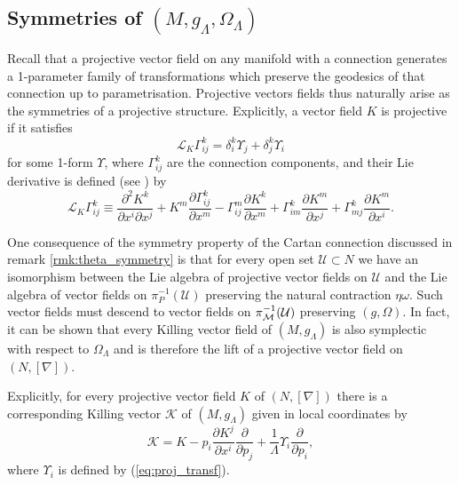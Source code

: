  \subsection{Symmetries of $(M,g_{\Lambda},\Omega_{\Lambda})$}

Recall that a projective vector field on any manifold with a connection
generates a 1-parameter family of transformations which preserve the
geodesics of that connection up to parametrisation. Projective vectors
fields thus naturally arise as the symmetries of a projective structure.
Explicitly, a vector field $K$ is projective if it satisfies
\begin{equation}
\mathcal{L}_{K}\Gamma_{ij}^{k}=\delta_{i}^{k}\Upsilon_{j}+\delta_{j}^{k}\Upsilon_{i}\label{eq:proj_transf}
\end{equation}
for some 1-form $\Upsilon$, where $\Gamma_{ij}^{k}$ are the connection
components, and their Lie derivative is defined (see \cite{yano})
by
\begin{equation}
\mathcal{L}_{K}\Gamma_{ij}^{k}\equiv\frac{\partial^{2}K^{k}}{\partial x^{i}\partial x^{j}}+K^{m}\frac{\partial\Gamma_{ij}^{k}}{\partial x^{m}}-\Gamma_{ij}^{m}\frac{\partial K^{k}}{\partial x^{m}}+\Gamma_{im}^{k}\frac{\partial K^{m}}{\partial x^{j}}+\Gamma_{mj}^{k}\frac{\partial K^{m}}{\partial x^{i}}.\label{eq:liederivGamma}
\end{equation}


One consequence of the symmetry property of the Cartan connection discussed in remark \ref{rmk:theta_symmetry} is that for every open set $\mathcal{U}\subset N$ we have an isomorphism between the Lie algebra of projective vector fields on $\mathcal{U}$ and the Lie algebra of vector fields on $\pi_P^{-1}(\mathcal{U})$ preserving the natural contraction $\eta\omega$. Such vector fields must descend to vector fields on $\pi_{\mathcal{M}}^{-1}(\mathcal{U})$ preserving $(g,\Omega)$. In fact, it can be shown that every Killing vector field of $(M,g_\Lambda)$ is also symplectic with respect to $\Omega_\Lambda$ and is therefore the lift of a projective vector field on $(N,[\nabla])$.

Explicitly, for every projective vector field $K$ of $(N,[\nabla])$
there is a corresponding Killing vector $\mathcal{K}$ of $(M,g_{\Lambda})$
given in local coordinates by 
\begin{equation}
\mathcal{K}=K-p_{i}\frac{\partial K^{j}}{\partial x^{i}}\frac{\partial}{\partial p_{j}}+\frac{1}{\Lambda}\Upsilon_{i}\frac{\partial}{\partial p_{i}},\label{eq:kvf_from_pvf}
\end{equation}
where $\Upsilon_{i}$ is defined by (\ref{eq:proj_transf}).

